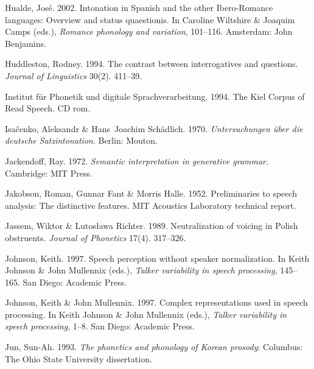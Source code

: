\documentclass[ number=1
,series=labphon
,output=long
,url=http://langsci-press.org/catalog/book/16
,isbn=978-3-944675-01-5
]{LSP/langsci}
\begin{document}
\begin{thebibliography}{284}
Hualde, José. 2002.
\newblock Intonation in {S}panish and the other {Ibero-Romance} languages:
  {O}verview and status quaestionis.
\newblock In Caroline Wiltshire \& Joaquim Camps (eds.), \emph{Romance
  phonology and variation}, 101--116. Amsterdam: John Benjamins.

Huddleston, Rodney. 1994.
\newblock The contrast between interrogatives and questions.
\newblock \emph{Journal of Linguistics} 30(2). 411--39.

{Institut f\"{u}r Phonetik und digitale Sprachverarbeitung}. 1994.
\newblock The {K}iel {C}orpus of {R}ead {S}peech.
\newblock CD rom.

Isa{\v{c}}enko, Aleksandr \& Hans~Joachim Sch{\"a}dlich. 1970.
\newblock \emph{Untersuchungen {\"u}ber die deutsche {S}atzintonation}.
\newblock Berlin: Mouton.

Jackendoff, Ray. 1972.
\newblock \emph{Semantic interpretation in generative grammar}.
\newblock Cambridge: MIT Press.

Jakobson, Roman, Gunnar Fant \& Morris Halle. 1952.
\newblock Preliminaries to speech analysis: {T}he distinctive features.
\newblock MIT {A}coustics {L}aboratory technical report.

Jassem, Wiktor \& Lutosława Richter. 1989.
\newblock Neutralization of voicing in {P}olish obstruents.
\newblock \emph{Journal of Phonetics} 17(4). 317--326.

Johnson, Keith. 1997.
\newblock Speech perception without speaker normalization.
\newblock In Keith Johnson \& John Mullennix (eds.), \emph{Talker variability
  in speech processing}, 145--165. San Diego: Academic Press.

Johnson, Keith \& John Mullennix. 1997.
\newblock Complex representations used in speech processing.
\newblock In Keith Johnson \& John Mullennix (eds.), \emph{Talker variability
  in speech processing}, 1--8. San Diego: Academic Press.

Jun, Sun-Ah. 1993.
\newblock \emph{The phonetics and phonology of {K}orean prosody}: Columbus: The
  Ohio State University dissertation.


\end{thebibliography}
\end{document}
